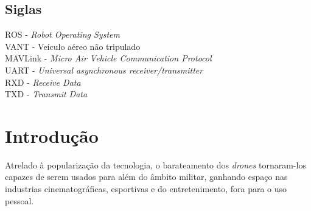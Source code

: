 \documentclass[12pt,a4paper,oneside]{book}
\begin{document}
%
\listoffigures
%
%
\thispagestyle{myheadings}
%


%
\listoftables
%
%
\thispagestyle{myheadings}
%


%
\tableofcontents
%
\thispagestyle{myheadings}

\clearpage



%



\section{Siglas}
ROS - \textit{Robot Operating System} \\
VANT - Veículo aéreo não tripulado \\
MAVLink - \textit{Micro Air Vehicle Communication Protocol} \\
UART - \textit{Universal asynchronous receiver/transmitter} \\
RXD - \textit{Receive Data}\\
TXD - \textit{Transmit Data}\\

\chapter{Introdução}
%
\thispagestyle{empty} 
%
%
Atrelado à popularização da tecnologia, o barateamento dos \textit{drones} tornaram-los capazes de serem usados para além do âmbito militar, ganhando espaço nas industrias cinematográficas, esportivas e do entretenimento, fora para o uso pessoal.
\end{document}
